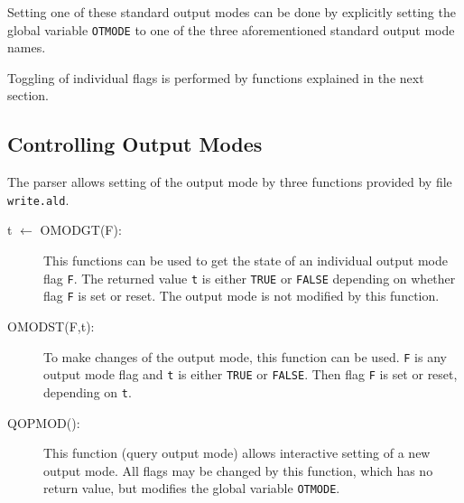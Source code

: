Setting one of these standard output modes can be done by explicitly
setting the global variable {\tt OTMODE} to one of the three aforementioned
standard output mode names.

Toggling of individual flags is performed by functions explained
in the next section.

\subsection{Controlling Output Modes}

The parser allows setting of the output mode by three functions provided
by file {\tt write.ald}.

\begin{description}
\item[t $\leftarrow$ OMODGT(F):] This functions can be used to get the
state of an individual output mode flag {\tt F}. The returned value
{\tt t} is either {\tt TRUE} or {\tt FALSE} depending on whether flag
{\tt F} is set or reset. The output mode is not modified by this function.
\item[OMODST(F,t):] To make changes of the output mode, this function can
be used. {\tt F} is any output mode flag and {\tt t} is either {\tt TRUE}
or {\tt FALSE}. 
Then flag {\tt F} is set or reset, depending on {\tt t}.
\item[QOPMOD():] This function (query output mode) allows interactive
setting of a new output mode. All flags may be changed by this function,
which has no return value, but modifies the global variable {\tt OTMODE}.
\end{description}
